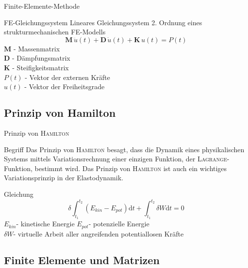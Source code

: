 \begin{frame}{Finite-Elemente-Methode}
	\begin{block}{FE-Gleichungssystem}
		Lineares Gleichungssystem 2. Ordnung eines strukturmechanischen FE-Modells
		\begin{equation*}
		\mathbf{M}\, \ddot{u}(t)+ \mathbf{D}\, \dot{u}(t)+ \mathbf{K}\, u(t) = P(t)
		\end{equation*}
		$ \mathbf{M} $ - Massenmatrix\\
		$ \mathbf{D} $ - Dämpfungsmatrix\\
		$ \mathbf{K} $ - Steifigkeitsmatrix\\
		$ P(t) $ - Vektor der externen Kräfte\\
		$ u(t) $ - Vektor der Freiheitsgrade
	\end{block}
\end{frame}

\subsection{Prinzip von Hamilton}
\begin{frame}{Prinzip von \textsc{Hamilton}}
	\begin{alertblock}{Begriff}
		Das Prinzip von \textsc{Hamilton} besagt, dass die Dynamik eines physikalischen Systems mittels Variationsrechnung einer einzigen Funktion, der \textsc{Lagrange}-Funktion, bestimmt wird.	Das Prinzip von \textsc{Hamilton} ist auch ein wichtiges Variationsprinzip in der Elastodynamik. \\
	\end{alertblock}
	\begin{block}{Gleichung}
		\begin{equation*}
		\delta\int_{t_{1}}^{t_{2}} \left( E_{kin}-E_{pot}\right)  \mathrm{d}t + \int_{t_{1}}^{t_{2}} \delta W \mathrm{d}t = 0
		\end{equation*}
		$ E_{kin} $- kinetische Energie \qquad \qquad 	$ E_{pot} $- potenzielle Energie\\
		$ \delta W $- virtuelle Arbeit aller angreifenden potentiallosen Kräfte
	\end{block}
\end{frame}


\subsection{Finite Elemente und Matrizen}

